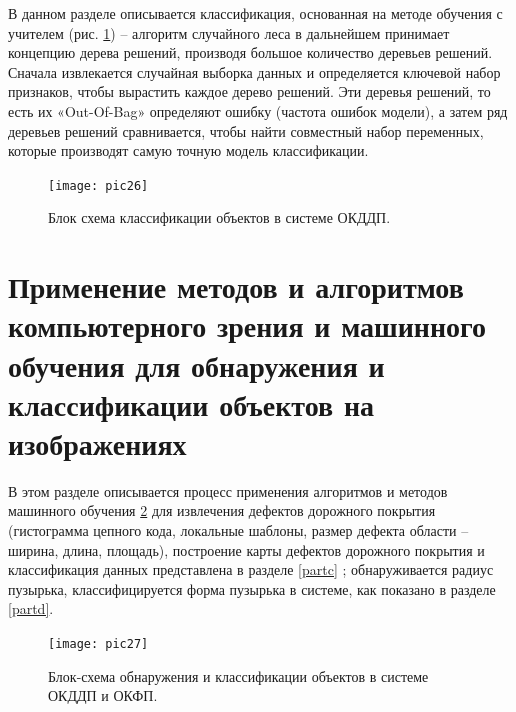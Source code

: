 \documentclass[a4paper,14pt]{extreport}
\begin{document}
В данном разделе описывается классификация, основанная на методе обучения с учителем (рис. \ref{pic26}) -- алгоритм случайного леса в дальнейшем принимает концепцию дерева решений, производя большое количество деревьев решений. Сначала извлекается случайная выборка данных и определяется ключевой набор признаков, чтобы вырастить каждое дерево решений. Эти деревья решений, то есть их «Out-Of-Bag» определяют ошибку (частота ошибок модели), а затем ряд деревьев решений сравнивается, чтобы найти совместный набор переменных, которые производят самую точную модель классификации.

\begin{figure}[ht!]
\centering
\texttt{[image: pic26]}
\caption{Блок схема классификации объектов в системе ОКДДП.}
	\label{pic26}
		\end{figure}	
		
%
\section{Применение методов и алгоритмов компьютерного зрения и машинного обучения для обнаружения и классификации объектов на изображениях}
В этом разделе описывается процесс применения алгоритмов и методов машинного обучения \ref{pic27} для извлечения дефектов дорожного покрытия (гистограмма цепного кода, локальные шаблоны, размер дефекта области – ширина, длина, площадь), построение карты дефектов дорожного покрытия и классификация данных представлена в разделе \ref{partc} ; обнаруживается радиус пузырька, классифицируется форма пузырька в системе, как показано в разделе \ref{partd}.
\begin{figure}[ht!]
\centering
\texttt{[image: pic27]}
\caption{Блок-схема обнаружения и классификации объектов в системе ОКДДП и ОКФП.}
	\label{pic27}
		\end{figure}
\end{document}
